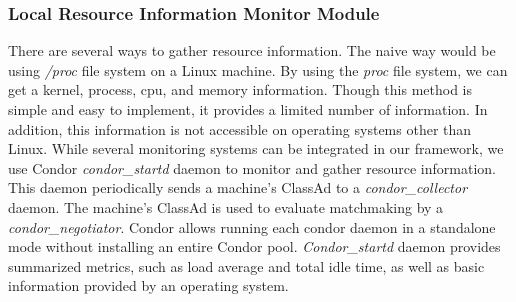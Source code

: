 \documentclass{acm_proc_article-sp}
\begin{document}
\subsubsection{Local Resource Information Monitor Module}
There are several ways to gather resource information. The naive way would be using \textit{/proc} file system on a Linux machine. 
By using the \textit{proc} file system, we can get a kernel, process, cpu, and memory information. 
Though this method is simple and easy to implement, it provides a limited number of information. In addition, this information is not accessible on operating systems other than Linux.
While several monitoring systems can be integrated in our framework, we use Condor\cite{condor} \textit{condor\_startd} daemon to monitor and gather resource information. 
This daemon periodically sends a machine's ClassAd\cite{classad} to a \textit{condor\_collector} daemon. 
The machine's ClassAd is used to evaluate matchmaking by a \textit{condor\_negotiator}. 
Condor allows running each condor daemon in a standalone mode without
installing an entire Condor pool. \textit{Condor\_startd} daemon provides summarized metrics, such as load average and total idle time, as well as basic information provided by an operating system.
\end{document}
